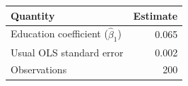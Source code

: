 \begin{center}
\begin{tabular}{lr}
\hline
Quantity & Estimate \\
\hline
Education coefficient ($\hat{\beta}_1$) & 0.065 \\
Usual OLS standard error & 0.002 \\
Observations & 200 \\
\hline
\end{tabular}
\end{center}
